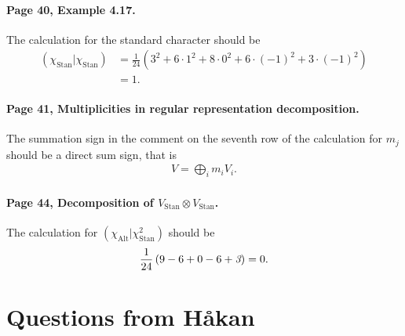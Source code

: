 \documentclass[12pt,a4paper]{article}
\theoremstyle{definition}
\theoremstyle{remark}
\numberwithin{equation}{section}
\newcommand{\1}{\mathbf{1}}
\newcommand{\0}{\mathbf{0}}
\newcommand{\Alt}{\text{Alt}}
\newcommand{\Stan}{\text{Stan}}
\begin{document}
		\paragraph{Page 40, Example 4.17.} The calculation for the standard character should be 
		\begin{align*}
			(\chi_\Stan|\chi_\Stan) &= \frac{1}{24}\left( 3^2 + 6 \cdot 1^2 + 8 \cdot 0^2 + 6 \cdot (-1)^2 + 3 \cdot (-1)^2 \right) \\
			&= 1.
		\end{align*}
		
		\paragraph{Page 41, Multiplicities in regular representation decomposition.} The summation sign in the comment on the seventh row of the calculation for $m_j$ should be a direct sum sign, that is \begin{align*}
			V = \bigoplus_i m_i V_i.
		\end{align*}
		
		\paragraph{Page 44, Decomposition of $V_\Stan \otimes V_\Stan$.} The calculation for $(\chi_\Alt|\chi_\Stan^2)$ should be \begin{align*}
			\frac{1}{24}\left(9-6+0-6+{\emph{3}}\right) = 0.
		\end{align*}
		
	\section*{Questions from Håkan}\text
	
\end{document}
